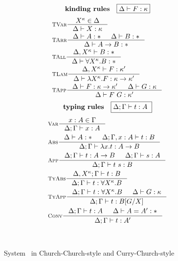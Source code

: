 \begin{figure}
\begin{singlespace}
\begin{minipage}{.46\textwidth}
\begin{align*}
\end{align*}
\[ \textbf{kinding rules} \quad \framebox{$ \Delta |- F:\kappa$}\]\vspace*{-1em}
\begin{align*}
& \inference[\sc TVar]{X^\kappa \in \Delta}{\Delta |- X:\kappa} \\
& \inference[\sc TArr]{\Delta |- A:* & \Delta |- B:*}{\Delta |- A -> B:*} \\
& \inference[\sc TAll]{\Delta,X^\kappa |- B:*}{\Delta |- \forall X^\kappa.B:*} \\
& \inference[\sc TLam]{\Delta,X^\kappa |- F:\kappa'}
		      {\Delta |- \l X^\kappa.F:\kappa -> \kappa'} \\
& \inference[\sc TApp]{\Delta |- F : \kappa -> \kappa' & \Delta |- G : \kappa}
		      {\Delta |- F ~ G : \kappa'} \\
\end{align*}
\[ \textbf{typing rules} \quad \framebox{$ \Delta;\Gamma |- t : A $ } \]
\vspace*{-1em}
\begin{align*}
& \inference[\sc Var]{x:A \in \Gamma}{\Delta;\Gamma |- x:A} \\
& \inference[\sc Abs]{\Delta |- A:* & \Delta;\Gamma,x:A |- t : B}
		     {\Delta;\Gamma |- \l x   .t : A -> B} \\
& \inference[\sc App]{\Delta;\Gamma |- t : A -> B & \Delta;\Gamma |- s : A}
		     {\Delta;\Gamma |- t~s : B} \\
& \inference[\sc TyAbs]{\Delta,X^\kappa;\Gamma |- t : B}
		       {\Delta;\Gamma |- t : \forall X^\kappa.B} \\
& \inference[\sc TyApp]{\Delta;\Gamma |- t : \forall X^\kappa.B & \Delta |- G:\kappa}
		       {\Delta;\Gamma |- t : B[G/X]} \\
& \inference[\sc Conv]{\Delta;\Gamma |- t : A & \Delta |- A = A' : *}
		      {\Delta;\Gamma |- t : A'}
\end{align*}
\end{minipage}
~\\
\caption{System \Fw\ in Church-Church-style and Curry-Church-style}
\label{fig:fw}
\end{singlespace}
\end{figure}

